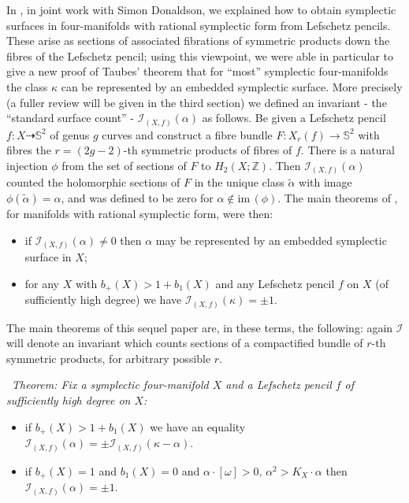 \documentclass[10pt]{article}
\newcommand{\zz}{\mathbb{Z}}
\newcommand{\sss}{\mathbb{S}}
\newcommand{\im}{\mathrm{im \,}}
\newcounter{Universal}[section]
\renewcommand{\theUniversal}{\thesection.\arabic{Universal}}
\newenvironment{Italic}{\refstepcounter{Universal} \par \vspace{0.5cm}
\noindent {\bf (\theUniversal)}\ \it}{\par \vspace{0.5cm}}
\newenvironment{Thm}{\begin{Italic}{\sc Theorem: }}{\end{Italic}}
\begin{document}
\vspace{0.2cm}

\noindent In \cite{SKDIS}, in joint work with Simon Donaldson, we
explained how to obtain symplectic surfaces in four-manifolds with
rational symplectic form from
Lefschetz pencils.  These arise as sections of associated fibrations
of symmetric products down the fibres of the Lefschetz pencil;  using
this viewpoint, we were able in particular to give a new proof of
Taubes' theorem that for ``most'' symplectic four-manifolds the
class $\kappa$ can be represented by an embedded symplectic surface.
More precisely (a fuller review will be given in the third
section) we defined an invariant - the ``standard surface count'' -
$\mathcal{I}_{(X,f)}(\alpha)$ as
follows.  Be given a Lefschetz pencil $f: X \dashrightarrow \sss^2$ of
genus $g$ curves 
and construct a fibre bundle $F:X_r(f) \rightarrow \sss^2$ with fibres
the $r=(2g-2)$-th symmetric products of fibres of $f$.  There is a
natural injection $\phi$ from the set of sections of $F$ to $H_2 (X; \zz)$.
Then $\mathcal{I}_{(X,f)}(\alpha)$ counted the holomorphic sections of
$F$ in the unique class $\tilde{\alpha}$ with image
$\phi(\tilde{\alpha}) = \alpha$, and was defined to be zero for
$\alpha \not \in \im(\phi)$.  The main theorems of \cite{SKDIS}, for
manifolds with rational symplectic form, were then: 

\begin{itemize}
\item if $\mathcal{I}_{(X,f)}(\alpha) \neq 0$ then $\alpha$
may be represented by an embedded symplectic surface in $X$;
\item for any $X$ with $b_+ (X) > 1+b_1 (X)$ and any Lefschetz pencil
  $f$ on $X$ (of sufficiently high degree) we have
  $\mathcal{I}_{(X,f)}(\kappa) = \pm 1$. 
\end{itemize}

\noindent The main theorems of this sequel paper are, in these terms, the
following:  again $\mathcal{I}$ will denote an invariant which counts
sections of a compactified bundle of $r$-th symmetric products, for
arbitrary possible $r$.

\begin{Thm} \label{Serreduality}
Fix a symplectic four-manifold $X$ and
a Lefschetz pencil $f$ of sufficiently high degree on $X$:
\begin{itemize}
\item if $b_+(X) > 1+b_1(X)$ we have an equality $\mathcal{I}_{(X,f)}(\alpha)
  = \pm \mathcal{I}_{(X,f)}(\kappa - \alpha)$. 
\item if $b_+(X)=1$ and $b_1(X)=0$ and $\alpha\cdot[\omega]>0, \, \alpha^2 >
  K_X\cdot\alpha$ then $\mathcal{I}_{(X,f)}(\alpha) = \pm 1$.
\end{itemize}
\end{Thm}
\end{document}
